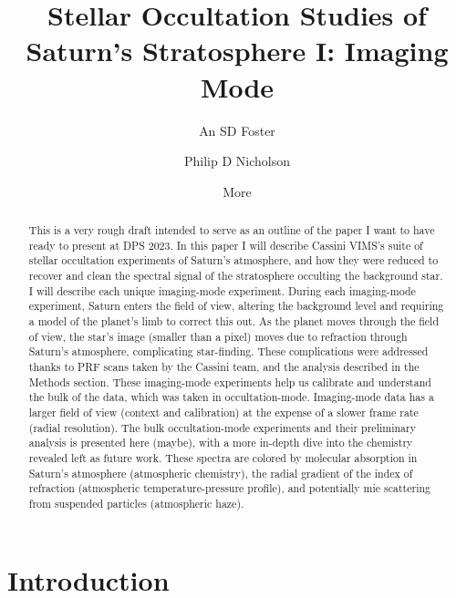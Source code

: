 \documentclass[twocolumn, twocolappendix, numberedappendix, linenumbers]{aastex631}
\begin{document}
\title{Stellar Occultation Studies of Saturn's Stratosphere I: Imaging Mode}
\author[1234-5678-8765-4321]{An SD Foster}

\author[1234-5678-8765-4321]{Philip D Nicholson}

\author{More}

\begin{abstract}

This is a very rough draft intended to serve as an outline of the paper
I want to have ready to present at DPS 2023. In this paper I will describe
Cassini VIMS's suite of stellar occultation experiments of Saturn's atmosphere,
and how they were reduced to recover and clean the spectral signal of the
stratosphere occulting the background star. I will describe each unique imaging-mode
experiment. During each imaging-mode experiment, Saturn enters the field of view,
altering the background level and requiring a model of the planet's limb to correct
this out. As the planet moves through the field of view, the star's image
(smaller than a pixel) moves due to refraction through Saturn's atmosphere,
complicating star-finding. These complications were addressed thanks to PRF scans
taken by the Cassini team, and the analysis described in the Methods section.
These imaging-mode experiments help us calibrate and understand the bulk of the
data, which was taken in occultation-mode. Imaging-mode data has a larger field
of view (context and calibration) at the expense of a slower frame rate (radial resolution).
The bulk occultation-mode experiments and their preliminary analysis is presented
here (maybe), with a more in-depth dive into the chemistry revealed left as future work.
These spectra are colored by molecular absorption in Saturn's atmosphere
(atmospheric chemistry), the radial gradient of the index of refraction
(atmospheric temperature-pressure profile), and potentially mie scattering
from suspended particles (atmospheric haze).

\end{abstract}


\section{Introduction} \label{sec:intro}
\end{document}
